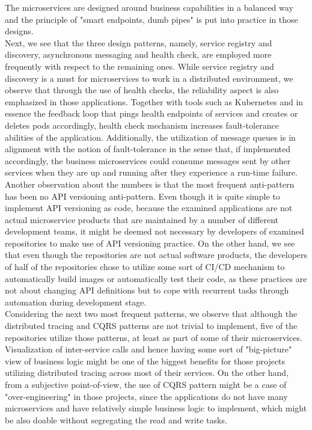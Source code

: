 \documentclass{Configuration_Files/PoliMi3i_thesis}
\begin{document}
The microservices are designed around business capabilities in a balanced way and the principle of "smart endpoints, dumb pipes" is put into practice in those designs.
\\
Next, we see that the three design patterns, namely, service registry and discovery, asynchronous messaging and health check, are employed more frequently with respect to the remaining ones.
While service registry and discovery is a must for microservices to work in a distributed environment, we observe that through the use of health checks, the reliability aspect is also emphasized in those applications.
Together with tools such as Kubernetes and in essence the feedback loop that pings health endpoints of services and creates or deletes pods accordingly, health check mechanism increases fault-tolerance abilities of the application.
Additionally, the utilization of message queues is in alignment with the notion of fault-tolerance in the sense that, if implemented accordingly, the business microservices could consume messages sent by other services when they are up and running after they experience a run-time failure.
\\
Another observation about the numbers is that the most frequent anti-pattern has been no API versioning anti-pattern.
Even though it is quite simple to implement API versioning as code, because the examined applications are not actual microservice products that are maintained by a number of different development teams, it might be deemed not necessary by developers of examined repositories to make use of API versioning practice.
On the other hand, we see that even though the repositories are not actual software products, the developers of half of the repositories chose to utilize some sort of CI/CD mechanism to automatically build images or automatically test their code, as these practices are not about changing API definitions but to cope with recurrent tasks through automation during development stage.
\\
Considering the next two most frequent patterns, we observe that although the distributed tracing and CQRS patterns are not trivial to implement, five of the repositories utilize those patterns, at least as part of some of their microservices.
Visualization of inter-service calls and hence having some sort of "big-picture" view of business logic might be one of the biggest benefits for those projects utilizing distributed tracing across most of their services.
On the other hand, from a subjective point-of-view, the use of CQRS pattern might be a case of "over-engineering" in those projects, since the applications do not have many microservices and have relatively simple business logic to implement, which might be also doable without segregating the read and write tasks.
\end{document}
